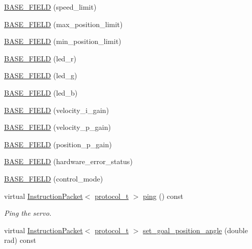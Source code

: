 \begin{DoxyCompactItemize}
\hyperlink{classdynamixel_1_1servos_1_1_base_servo_a28a3e801191c864226610c99163b906a}{B\+A\+S\+E\+\_\+\+F\+I\+E\+LD} (speed\+\_\+limit)
\item 
\hyperlink{classdynamixel_1_1servos_1_1_base_servo_a8f269d5d442445a4744e6404b5cb2c58}{B\+A\+S\+E\+\_\+\+F\+I\+E\+LD} (max\+\_\+position\+\_\+limit)
\item 
\hyperlink{classdynamixel_1_1servos_1_1_base_servo_aaefe353baec0ad45d9310e985da01fd7}{B\+A\+S\+E\+\_\+\+F\+I\+E\+LD} (min\+\_\+position\+\_\+limit)
\item 
\hyperlink{classdynamixel_1_1servos_1_1_base_servo_a2675879e1916600b4251a8798dda7792}{B\+A\+S\+E\+\_\+\+F\+I\+E\+LD} (led\+\_\+r)
\item 
\hyperlink{classdynamixel_1_1servos_1_1_base_servo_ad004618d6add77d2a3599dfe0a9b8be2}{B\+A\+S\+E\+\_\+\+F\+I\+E\+LD} (led\+\_\+g)
\item 
\hyperlink{classdynamixel_1_1servos_1_1_base_servo_afbf232f99d9b318714936dd12fd71474}{B\+A\+S\+E\+\_\+\+F\+I\+E\+LD} (led\+\_\+b)
\item 
\hyperlink{classdynamixel_1_1servos_1_1_base_servo_a87e0bff5c474582d9bbd1ffe45f91da5}{B\+A\+S\+E\+\_\+\+F\+I\+E\+LD} (velocity\+\_\+i\+\_\+gain)
\item 
\hyperlink{classdynamixel_1_1servos_1_1_base_servo_a3ecd90f9f9c23eefeb298508ce7d26d9}{B\+A\+S\+E\+\_\+\+F\+I\+E\+LD} (velocity\+\_\+p\+\_\+gain)
\item 
\hyperlink{classdynamixel_1_1servos_1_1_base_servo_a0aa14b2dc61dafdb0e1e238a37e57083}{B\+A\+S\+E\+\_\+\+F\+I\+E\+LD} (position\+\_\+p\+\_\+gain)
\item 
\hyperlink{classdynamixel_1_1servos_1_1_base_servo_a8a5b6f0cccde10173a942d1da92a4064}{B\+A\+S\+E\+\_\+\+F\+I\+E\+LD} (hardware\+\_\+error\+\_\+status)
\item 
\hyperlink{classdynamixel_1_1servos_1_1_base_servo_ad9fe76845a8b139921b35b7d346480e1}{B\+A\+S\+E\+\_\+\+F\+I\+E\+LD} (control\+\_\+mode)
\item 
virtual \hyperlink{classdynamixel_1_1_instruction_packet}{Instruction\+Packet}$<$ \hyperlink{classdynamixel_1_1servos_1_1_base_servo_ac484c11279ee2576a9a3bb8c940e0baf}{protocol\+\_\+t} $>$ \hyperlink{classdynamixel_1_1servos_1_1_base_servo_adae0a44afbebfb03343d325648387301}{ping} () const 
\begin{DoxyCompactList}\small\item\em Ping the servo. \end{DoxyCompactList}\item 
virtual \hyperlink{classdynamixel_1_1_instruction_packet}{Instruction\+Packet}$<$ \hyperlink{classdynamixel_1_1servos_1_1_base_servo_ac484c11279ee2576a9a3bb8c940e0baf}{protocol\+\_\+t} $>$ \hyperlink{classdynamixel_1_1servos_1_1_base_servo_ac91b383ed4ba24ccc142fe6cb08479fe}{set\+\_\+goal\+\_\+position\+\_\+angle} (double rad) const 

\end{DoxyCompactItemize}
